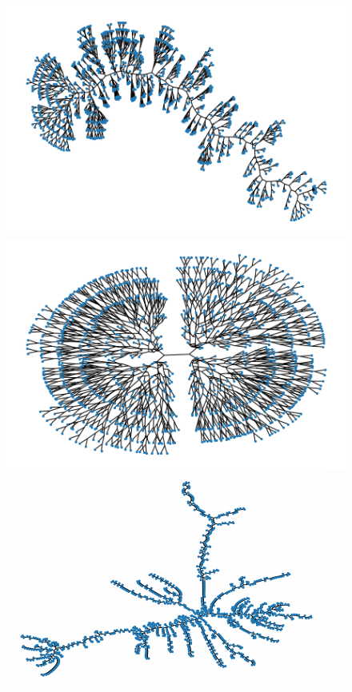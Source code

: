 \documentclass[12pt,twoside]{report}
\begin{document}
\begin{figure}[H]
\begin{center}
\begin{minipage}{0.45\linewidth}
\includegraphics[width=\linewidth]{figures/er_dendro.png}
\end{minipage}%
\hfill
\begin{minipage}{0.45\linewidth}
\includegraphics[width=\linewidth]{figures/fractal_dendro.png}
\end{minipage}%
\hfill
\begin{minipage}{0.45\linewidth}
\includegraphics[width=\linewidth]{figures/uvl_dendro.png}

\end{minipage}
\end{center}
\end{figure}
\end{document}
